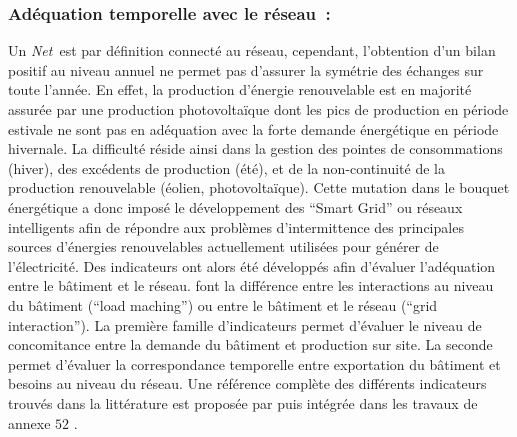 \subsubsection{Adéquation temporelle avec le réseau~:} %
\label{ssub:adequation_temporelle_avec_le_réseau}
Un \textit{Net}\, est par définition connecté au réseau, cependant, l’obtention
d’un bilan positif au niveau annuel ne permet pas d’assurer la symétrie des échanges sur
toute l’année. En effet, la production d’énergie renouvelable est en majorité assurée par
une production photovoltaïque dont les pics de production en période estivale ne sont pas
en adéquation avec la forte demande énergétique en période hivernale. La difficulté réside
ainsi dans la gestion des pointes de consommations (hiver), des excédents de production
(été), et de la non-continuité de la production renouvelable (éolien, photovoltaïque).
Cette mutation dans le bouquet énergétique a donc imposé le développement des
\enquote{Smart Grid} ou réseaux intelligents afin de répondre aux problèmes d’intermittence
des principales sources d’énergies renouvelables actuellement utilisées pour générer de
l’électricité. Des indicateurs ont alors été développés afin d’évaluer l’adéquation entre
le bâtiment et le réseau. \textcite{Voss2010} font la différence entre les interactions au
niveau du bâtiment (\enquote{load maching}) ou entre le bâtiment et le réseau
(\enquote{grid interaction}). La première famille d’indicateurs permet d’évaluer le niveau
de concomitance entre la demande du bâtiment et production sur site. La seconde permet
d’évaluer la correspondance temporelle entre exportation du bâtiment et besoins au niveau
du réseau. Une référence complète des différents indicateurs trouvés dans la littérature
est proposée par \textcite{Salom2011} puis intégrée dans les travaux de annexe $52$
\parencite{Salom2014}.



